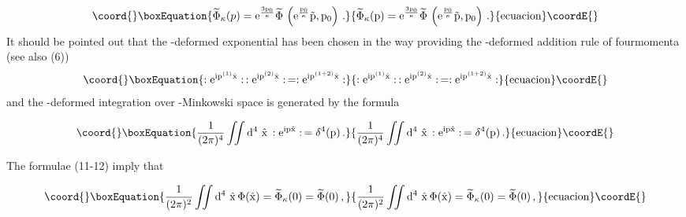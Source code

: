 \documentclass[a4paper,a4paper]{article}
\providecommand\E{\rm e}
\providecommand\D{\rm d }
\begin{document}
\begin{equation}\coord{}\boxEquation{
\widetilde{\Phi}_{\kappa}(p)  =   \E^{ {3p_{0}\over \kappa}}
{\widetilde{\Phi}}\, \left( 
  \E^{{p_{0}\over \kappa}}\vec{p}, p_{0}\right)\, .
}{
\widetilde{\Phi}_{\kappa}(p)  =   \E^{ {3p_{0}\over \kappa}}
{\widetilde{\Phi}}\, \left( 
  \E^{{p_{0}\over \kappa}}\vec{p}, p_{0}\right)\, .
}{ecuacion}\coordE{}\end{equation}
It should be pointed out that the \myHighlight{$\kappa$}\coordHE{}-deformed exponential 
has
been chosen in the way providing the \myHighlight{$\kappa$}\coordHE{}-deformed addition
rule of fourmomenta  (see also (6))
\begin{equation}\coord{}\boxEquation{
 : \E^{ip^{(1)}\hat{x}}: \, :  
  \E^{ip^{(2)}\hat{x}}: \,  =
 :  \E^{ip^{(1+2)}\hat{x}}: 
 }{
 : \E^{ip^{(1)}\hat{x}}: \, :  
  \E^{ip^{(2)}\hat{x}}: \,  =
 :  \E^{ip^{(1+2)}\hat{x}}: 
 }{ecuacion}\coordE{}\end{equation}
and the \myHighlight{$\kappa$}\coordHE{}-deformed integration over
\myHighlight{$\kappa$}\coordHE{}-Minkowski space is generated by the formula

\begin{equation}\coord{}\boxEquation{
{1\over (2\pi)^{4}}
\int\!\!\!\int \D^{4}\ \hat{x}\, : \E^{ip\hat{x}}: \, =
\delta^{4} (p)\, .
}{
{1\over (2\pi)^{4}}
\int\!\!\!\int \D^{4}\ \hat{x}\, : \E^{ip\hat{x}}: \, =
\delta^{4} (p)\, .
}{ecuacion}\coordE{}\end{equation}

The formulae (11-12) imply that

\begin{equation}\coord{}\boxEquation{
{1\over (2\pi)^{2}}
\int\!\!\!\int \D^{4}\  {\hat{x}} \, \Phi({\hat{x}}) =
{\widetilde{\Phi}}_{\kappa} (0) = {\widetilde{\Phi}} (0)\, ,
}{
{1\over (2\pi)^{2}}
\int\!\!\!\int \D^{4}\  {\hat{x}} \, \Phi({\hat{x}}) =
{\widetilde{\Phi}}_{\kappa} (0) = {\widetilde{\Phi}} (0)\, ,
}{ecuacion}\coordE{}\end{equation}
\end{document}
